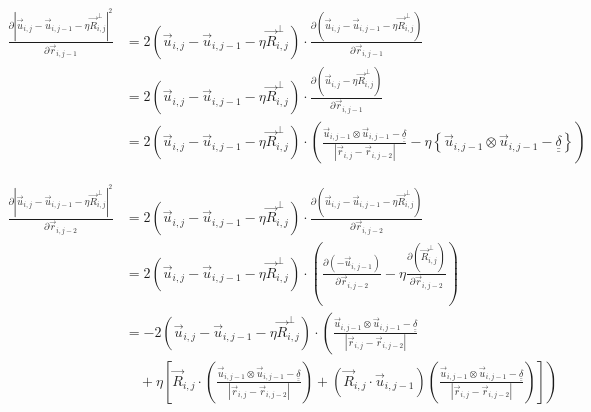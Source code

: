 \documentclass{article}
\renewcommand{\ij}{_{i,j}}
\newcommand{\ijj}{_{i,j-1}}
\newcommand{\ijjj}{_{i,j-2}}
\newcommand{\magn}[1]{\left\vert #1 \right\vert }
\renewcommand{\part}[2]{\frac{\partial #1 }{\partial #2}}
\newcommand{\ten}[1]{\underline{\underline{#1}}}
\newcommand{\rij}{\vec{r} \ij}
\newcommand{\Rij}{\vec{R} \ij}
\newcommand{\rijj}{\vec{r} \ijj}
\newcommand{\rijjj}{\vec{r} \ijjj}
\newcommand{\uij}{\vec{u} \ij}
\newcommand{\uijj}{\vec{u} \ijj}
\begin{document}
\begin{align*}
  \part{\magn{\uij - \uijj - \eta \Rij^\perp}^2 }{
    \rijj
  }
  &=
  2\left(\uij - \uijj - \eta \Rij^\perp\right) \cdot
  \part{\left(\uij - \uijj - \eta \Rij^\perp\right)}{\rijj}
  \\
  &=
  2\left(\uij - \uijj - \eta \Rij^\perp\right) \cdot
  \part{\left(\uij - \eta \Rij^\perp\right)}{\rijj} 
  \\
  &=
  2\left(\uij - \uijj - \eta \Rij^\perp\right) \cdot
  \left(
  \frac{\uijj \otimes \uijj - \ten{\delta} }{\magn{\rij - \rijjj}}
  -
  \eta 
  \left\{
  \uijj \otimes \uijj 
  -
  \ten{\delta} 
  \right\}
  \right)
\end{align*}


\begin{align*}
  \part{\magn{\uij - \uijj - \eta \Rij^\perp}^2 }{
    \rijjj
  }
  &=
  2\left(\uij - \uijj - \eta \Rij^\perp\right) \cdot
  \part{\left(\uij - \uijj - \eta \Rij^\perp\right)}{\rijjj}
  \\
  & =
  2\left(\uij - \uijj - \eta \Rij^\perp\right) \cdot
  \left(
  \part{ \left( - \uijj \right) }{\rijjj}
  -
  \eta 
  \part{\left( \Rij^\perp\right)}{\rijjj}
  \right)
  \\
  & =
  - 2\left(\uij - \uijj - \eta \Rij^\perp\right) 
  \cdot
  \left(
  \frac{\uijj \otimes \uijj - \ten{\delta} }{\magn{\rij - \rijjj}}
  \right. 
  \\
  &
  \quad 
  +
  \eta 
  \left.
  \left[
  \Rij \cdot 
  \left(
    \frac{\uijj \otimes \uijj - \ten{\delta}}{\magn{\rij - \rijjj}}
  \right)
  + 
  \left(
  \vec{R}\ij \cdot \vec{u} \ijj
  \right)
  {
  \left(
  \frac{\uijj \otimes \uijj - \ten{\delta} }{\magn{\rij - \rijjj}}
  \right)
  }
  \right]
  \right)
\end{align*}
\end{document}
